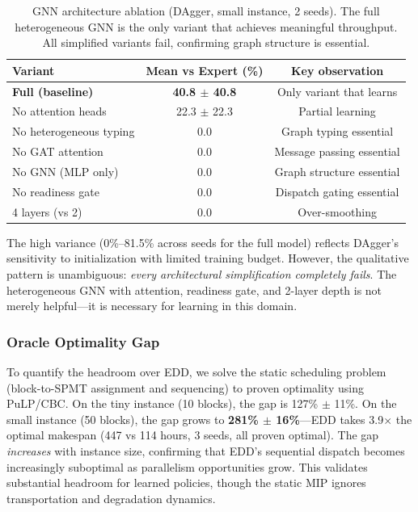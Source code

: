 \documentclass[11pt,a4paper]{article}
\begin{document}
\begin{table}[h]
\centering
\caption{GNN architecture ablation (DAgger, small instance, 2 seeds). The full heterogeneous GNN is the only variant that achieves meaningful throughput. All simplified variants fail, confirming graph structure is essential.}
\label{tab:ablation}
\begin{tabular}{lcc}
\toprule
Variant & Mean vs Expert (\%) & Key observation \\
\midrule
\textbf{Full (baseline)} & \textbf{40.8 $\pm$ 40.8} & Only variant that learns \\
No attention heads & 22.3 $\pm$ 22.3 & Partial learning \\
\midrule
No heterogeneous typing & 0.0 & Graph typing essential \\
No GAT attention & 0.0 & Message passing essential \\
No GNN (MLP only) & 0.0 & Graph structure essential \\
No readiness gate & 0.0 & Dispatch gating essential \\
4 layers (vs 2) & 0.0 & Over-smoothing \\
\bottomrule
\end{tabular}
\end{table}

\noindent The high variance (0\%--81.5\% across seeds for the full model) reflects DAgger's sensitivity to initialization with limited training budget. However, the qualitative pattern is unambiguous: \textit{every architectural simplification completely fails}. The heterogeneous GNN with attention, readiness gate, and 2-layer depth is not merely helpful---it is necessary for learning in this domain.

\subsubsection{Oracle Optimality Gap}

To quantify the headroom over EDD, we solve the static scheduling problem (block-to-SPMT assignment and sequencing) to proven optimality using PuLP/CBC. On the tiny instance (10 blocks), the gap is 127\% $\pm$ 11\%. On the small instance (50 blocks), the gap grows to \textbf{281\% $\pm$ 16\%}---EDD takes 3.9$\times$ the optimal makespan (447 vs 114 hours, 3 seeds, all proven optimal). The gap \textit{increases} with instance size, confirming that EDD's sequential dispatch becomes increasingly suboptimal as parallelism opportunities grow. This validates substantial headroom for learned policies, though the static MIP ignores transportation and degradation dynamics.
\end{document}
